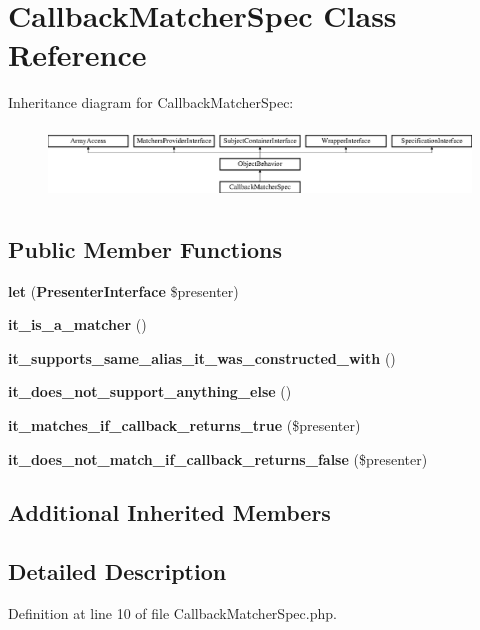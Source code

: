 \section{Callback\+Matcher\+Spec Class Reference}
\label{classspec_1_1_php_spec_1_1_matcher_1_1_callback_matcher_spec}
Inheritance diagram for Callback\+Matcher\+Spec\+:\begin{figure}[H]
\begin{center}
\leavevmode
\includegraphics[height=1.953488cm]{classspec_1_1_php_spec_1_1_matcher_1_1_callback_matcher_spec}
\end{center}
\end{figure}
\subsection*{Public Member Functions}
\begin{DoxyCompactItemize}
\item 
{\bf let} ({\bf Presenter\+Interface} \$presenter)
\item 
{\bf it\+\_\+is\+\_\+a\+\_\+matcher} ()
\item 
{\bf it\+\_\+supports\+\_\+same\+\_\+alias\+\_\+it\+\_\+was\+\_\+constructed\+\_\+with} ()
\item 
{\bf it\+\_\+does\+\_\+not\+\_\+support\+\_\+anything\+\_\+else} ()
\item 
{\bf it\+\_\+matches\+\_\+if\+\_\+callback\+\_\+returns\+\_\+true} (\$presenter)
\item 
{\bf it\+\_\+does\+\_\+not\+\_\+match\+\_\+if\+\_\+callback\+\_\+returns\+\_\+false} (\$presenter)
\end{DoxyCompactItemize}
\subsection*{Additional Inherited Members}


\subsection{Detailed Description}


Definition at line 10 of file Callback\+Matcher\+Spec.\+php.



